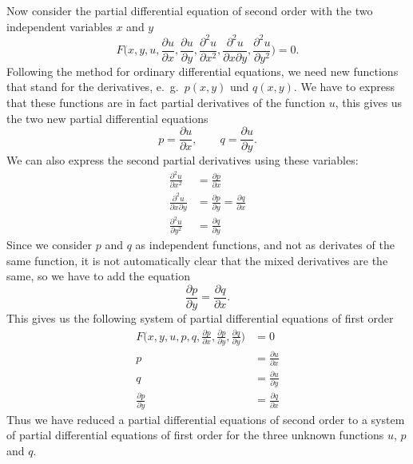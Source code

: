 Now consider the partial differential equation of second order with
the two independent variables $x$ and $y$
\[
F\biggl(x,y,u,\frac{\partial u}{\partial x},\frac{\partial u}{\partial y},
\frac{\partial^2 u}{\partial x^2},\frac{\partial^2 u}{\partial x\partial y},
\frac{\partial^2u}{\partial y^2}\biggr)=0.
\]
Following the method for ordinary differential equations, we need new
functions that stand for the derivatives, e.~g.~$p(x,y)$ und $q(x,y)$.
We have to express that these functions are in fact partial
derivatives of the function $u$, this gives us the two new partial
differential equations
\[
p=\frac{\partial u}{\partial x},\qquad q=\frac{\partial u}{\partial y}.
\]
We can also express the second partial derivatives using these variables:
\begin{align*}
\frac{\partial^2 u}{\partial x^2}&=\frac{\partial p}{\partial x}\\
\frac{\partial^2 u}{\partial x\partial y}&=\frac{\partial p}{\partial y}=\frac{\partial q}{\partial x}\\
\frac{\partial^2 u}{\partial y^2}&=\frac{\partial q}{\partial y}
\end{align*}
Since we consider $p$ and $q$ as independent functions, and not as
derivates of the same function, it is not automatically clear that 
the mixed derivatives are the same, so we have to add the equation
\[
\frac{\partial p}{\partial y}
=
\frac{\partial q}{\partial x}.
\]
This gives us the following system of partial differential equations
of first order
\begin{align*}
F\biggl(x,y,u,p,q,\frac{\partial p}{\partial x},\frac{\partial p}{\partial y},\frac{\partial q}{\partial y}\biggr)&=0\\
p&=\frac{\partial u}{\partial x}\\
q&=\frac{\partial u}{\partial y}\\
\frac{\partial p}{\partial y}&=\frac{\partial q}{\partial x}
\end{align*}
Thus we have reduced a partial differential equations of second order
to a system of partial differential equations of first order for 
the three unknown functions $u$, $p$ and $q$.

